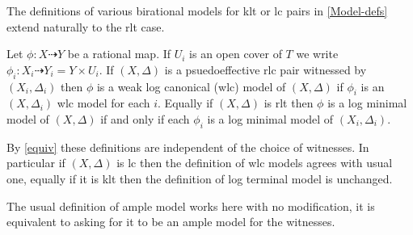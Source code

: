 \documentclass[a4paper,12pt]{amsart}
\begin{document}
%		
%		
%		
%		
%		

	The definitions of various birational models for klt or lc pairs in \autoref{Model-defs} extend naturally to the rlt case.
	
	\begin{definition}
		Let $\phi:X \dashrightarrow Y$ be a rational map. If $U_{i}$ is an open cover of $T$ we write $\phi_{i}:X_{i}\dashrightarrow Y_{i}=Y\times U_{i}$.
		If $(X,\Delta)$ is a psuedoeffective rlc pair witnessed by $(X_{i},\Delta_{i})$ then $\phi$ is a weak log canonical (wlc) model of $(X,\Delta)$ if $\phi_{i}$ is an $(X,\Delta_{i})$ wlc model for each $i$. Equally if $(X,\Delta)$ is rlt then $\phi$ is a log minimal model of $(X,\Delta)$ if and only if each $\phi_{i}$ is a log minimal model of $(X_{i},\Delta_{i})$.
	\end{definition}
	
	By \autoref{equiv} these definitions are independent of the choice of witnesses. In particular if $(X,\Delta)$ is lc then the definition of wlc models agrees with usual one, equally if it is klt then the definition of log terminal model is unchanged.
	
	\begin{remark}
		The usual definition of ample model works here with no modification, it is equivalent to asking for it to be an ample model for the witnesses.
	\end{remark}
\end{document}
